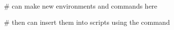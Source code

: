 # can make new environments and commands here

# then can insert them into scripts using the  command